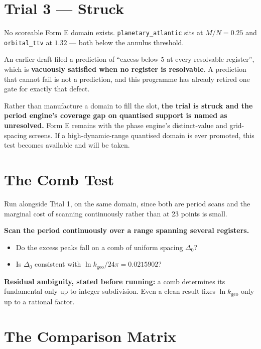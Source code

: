\documentclass[11pt, letterpaper, openany]{book}
\newcommand{\kgeo}{k_{\mathrm{geo}}}
\begin{document}
\section{Trial 3 --- Struck}

\begin{warningbox}
No scoreable Form E domain exists. \texttt{planetary\_atlantic} sits at $M/N = 0.25$ and
\texttt{orbital\_ttv} at $1.32$ --- both below the annulus threshold.

\medskip
\noindent An earlier draft filed a prediction of ``excess below 5 at every resolvable
register'', which is \textbf{vacuously satisfied when no register is resolvable}. A prediction
that cannot fail is not a prediction, and this programme has already retired one gate for
exactly that defect.

\medskip
\noindent Rather than manufacture a domain to fill the slot, \textbf{the trial is struck and the
period engine's coverage gap on quantised support is named as unresolved.} Form E remains with
the phase engine's distinct-value and grid-spacing screens. If a high-dynamic-range quantised
domain is ever promoted, this test becomes available and will be taken.
\end{warningbox}

\section{The Comb Test}

\begin{predictionbox}
Run alongside Trial 1, on the same domain, since both are period scans and the marginal cost of
scanning continuously rather than at 23 points is small.

\textbf{Scan the period continuously over a range spanning several registers.}
\begin{itemize}
    \item Do the excess peaks fall on a comb of uniform spacing $\Delta_0$?
    \item Is $\Delta_0$ consistent with $\ln \kgeo / 24\pi = 0.0215902$?
\end{itemize}

\textbf{Residual ambiguity, stated before running:} a comb determines its fundamental only up to
integer subdivision. Even a clean result fixes $\ln \kgeo$ only up to a rational factor.
\end{predictionbox}

\section{The Comparison Matrix}
\end{document}
